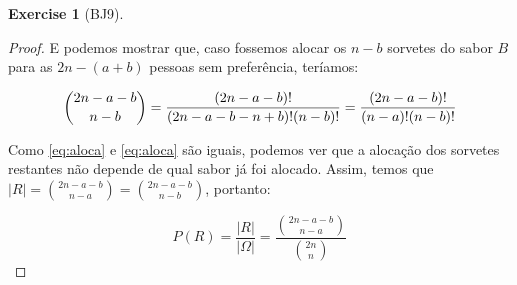 \documentclass[
]{article}
\theoremstyle{definition}
\theoremstyle{definition}
\theoremstyle{definition}
\newtheorem{exercise}{Exercise}[section]
\theoremstyle{definition}
\theoremstyle{remark}
\begin{document}
\begin{exercise}[BJ9]
\begin{proof}
E podemos mostrar que, caso fossemos alocar os \(n-b\) sorvetes do sabor \(B\) para as \(2n-(a+b)\) pessoas sem preferência, teríamos:

\begin{equation}
\binom{2n-a-b}{n-b} = \frac{(2n-a-b)!}{(2n-a-b-n+b)!(n-b)!} = \frac{(2n-a-b)!}{(n-a)!(n-b)!}\\
\label{eq:alocb}
\end{equation}

Como \eqref{eq:aloca} e \eqref{eq:aloca} são iguais, podemos ver que a alocação dos sorvetes restantes não depende de qual sabor já foi alocado. Assim, temos que \(|R| = \binom{2n-a-b}{n-a} = \binom{2n-a-b}{n-b}\), portanto:

\begin{equation*}
P(R) = \frac{|R|}{|\Omega|} = \frac{\binom{2n-a-b}{n-a}}{\binom{2n}{n}}
\end{equation*}
\end{proof}

\end{exercise}
\end{document}
